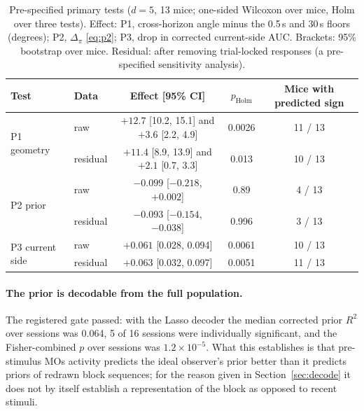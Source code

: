 \documentclass{article}
\newcommand{\holm}{p_{\mathrm{Holm}}}
\begin{document}
\begin{table}[t]
  \caption{Pre-specified primary tests ($d=5$, 13 mice; one-sided Wilcoxon over mice, Holm over three tests). Effect:
  P1, cross-horizon angle minus the 0.5\,s and 30\,s floors (degrees); P2, $\Delta_\pi$ \eqref{eq:p2}; P3, drop in
  corrected current-side AUC. Brackets: 95\% bootstrap over mice. Residual: after removing trial-locked responses
  (a pre-specified sensitivity analysis).}
  \label{tab:primary}
  \centering\small
  \begin{tabular}{llccc}
    \toprule
    Test & Data & Effect [95\% CI] & $\holm$ & Mice with predicted sign \\
    \midrule
    \multirow{2}{*}{P1 geometry} & raw      & $+12.7$ [10.2, 15.1] and $+3.6$ [2.2, 4.9] & 0.0026 & 11 / 13 \\
                                 & residual & $+11.4$ [8.9, 13.9] and $+2.1$ [0.7, 3.3]  & 0.013  & 10 / 13 \\
    \multirow{2}{*}{P2 prior}    & raw      & $-0.099$ [$-0.218$, $+0.002$] & 0.89  & 4 / 13 \\
                                 & residual & $-0.093$ [$-0.154$, $-0.038$] & 0.996 & 3 / 13 \\
    \multirow{2}{*}{P3 current side} & raw      & $+0.061$ [0.028, 0.094] & 0.0061 & 10 / 13 \\
                                     & residual & $+0.063$ [0.032, 0.097] & 0.0051 & 11 / 13 \\
    \bottomrule
  \end{tabular}
\end{table}

\paragraph{The prior is decodable from the full population.} The registered gate passed: with the Lasso decoder the
median corrected prior $R^2$ over sessions was 0.064, 5 of 16 sessions were individually significant, and the
Fisher-combined $p$ over sessions was $1.2\times10^{-5}$. What this establishes is that pre-stimulus MOs activity predicts the
ideal observer's prior better than it predicts priors of redrawn block sequences; for the reason given in
Section~\ref{sec:decode} it does not by itself establish a representation of the block as opposed to recent stimuli.
\end{document}
